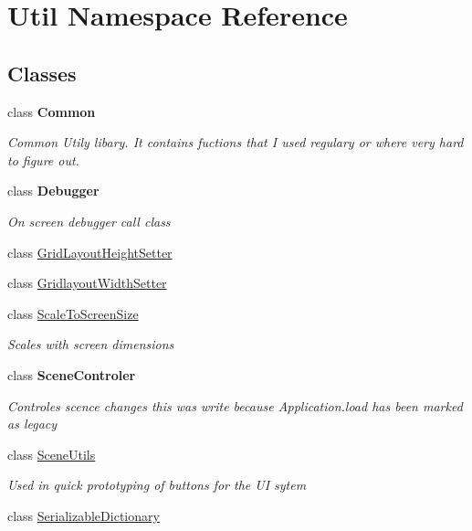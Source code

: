 \hypertarget{namespace_util}{}\section{Util Namespace Reference}
\label{namespace_util}
\subsection*{Classes}
\begin{DoxyCompactItemize}
\item 
class {\bfseries Common}
\begin{DoxyCompactList}\small\item\em Common Utily libary. It contains fuctions that I used regulary or where very hard to figure out. \end{DoxyCompactList}\item 
class {\bfseries Debugger}
\begin{DoxyCompactList}\small\item\em On screen debugger call class \end{DoxyCompactList}\item 
class \hyperlink{class_util_1_1_grid_layout_height_setter}{Grid\+Layout\+Height\+Setter}
\item 
class \hyperlink{class_util_1_1_gridlayout_width_setter}{Gridlayout\+Width\+Setter}
\item 
class \hyperlink{class_util_1_1_scale_to_screen_size}{Scale\+To\+Screen\+Size}
\begin{DoxyCompactList}\small\item\em Scales with screen dimensions \end{DoxyCompactList}\item 
class {\bfseries Scene\+Controler}
\begin{DoxyCompactList}\small\item\em Controles scence changes this was write because Application.\+load has been marked as legacy \end{DoxyCompactList}\item 
class \hyperlink{class_util_1_1_scene_utils}{Scene\+Utils}
\begin{DoxyCompactList}\small\item\em Used in quick prototyping of buttons for the UI sytem \end{DoxyCompactList}\item 
class \hyperlink{class_util_1_1_serializable_dictionary}{Serializable\+Dictionary}
\item 

\end{DoxyCompactItemize}
